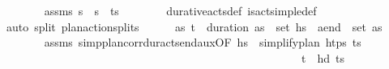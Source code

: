 \begin{isabellebody}
\ \ \ \ \ \ \isamarkupfalse%
\ assms\ {\isacartoucheopen}{\isasympi}s\ {\isacharequal}{\kern0pt}\ {\isasympi}s\ {\isacharat}{\kern0pt}\ {\isacharparenleft}{\kern0pt}{\isacharparenleft}{\kern0pt}t\isactrlsub {\isasympi}{\isacharcomma}{\kern0pt}{\isasympi}{\isacharparenright}{\kern0pt}{\isacharhash}{\kern0pt}{\isasympi}s\isanewline
\ \ \ \ \ \ \isamarkupfalse%
\ durative{\isacharunderscore}{\kern0pt}acts{\isacharunderscore}{\kern0pt}def\ is{\isacharunderscore}{\kern0pt}act{\isacharunderscore}{\kern0pt}simple{\isacharunderscore}{\kern0pt}def\ \isamarkupfalse%
\ {\isacharparenleft}{\kern0pt}auto\ split{\isacharcolon}{\kern0pt}\ plan{\isacharunderscore}{\kern0pt}action{\isachardot}{\kern0pt}splits{\isacharparenright}{\kern0pt}\isanewline
\ \ \ \ \isamarkupfalse%
\ {\isachardoublequoteopen}{\isasymexists}as{\isachardot}{\kern0pt}\ {\isacharparenleft}{\kern0pt}t\isactrlsub {\isasympi}\ {\isacharplus}{\kern0pt}\ {\isacharparenleft}{\kern0pt}duration\ {\isasympi}{\isacharparenright}{\kern0pt}{\isacharcomma}{\kern0pt}as{\isacharparenright}{\kern0pt}\ {\isasymin}\ set\ hs{\isacharprime}{\kern0pt}\ {\isasymand}\ a\isactrlsub e\isactrlsub n\isactrlsub d\ {\isasymin}\ set\ as{\isachardoublequoteclose}\isanewline
\ \ \ \ \ \ \isamarkupfalse%
\ assms\ simp{\isacharunderscore}{\kern0pt}plan{\isacharunderscore}{\kern0pt}corr{\isacharunderscore}{\kern0pt}dur{\isacharunderscore}{\kern0pt}acts{\isacharunderscore}{\kern0pt}end{\isacharunderscore}{\kern0pt}aux{\isacharbrackleft}{\kern0pt}OF\ {\isacartoucheopen}hs{\isacharprime}{\kern0pt}\ {\isacharequal}{\kern0pt}\ simplify{\isacharunderscore}{\kern0pt}plan\ htps\ {\isacharparenleft}{\kern0pt}{\isacharparenleft}{\kern0pt}t\isactrlsub {\isasympi}{\isacharcomma}{\kern0pt}{\isasympi}{\isacharparenright}{\kern0pt}{\isacharhash}{\kern0pt}{\isasympi}s\ \isanewline
\ \ \ \ \ \ \ \ \ \ \ \ \ \ \ \ \ \ \ \ \ \ \ \ \ \ \ \ \ \ \ \ \ \ \ \ \ \ \ \ \ \ \ \ \ \ \ \ \ \ \ \ \ {\isacartoucheopen}{\isacharparenleft}{\kern0pt}t\isactrlsub {\isasympi}{\isacharcomma}{\kern0pt}{\isasympi}{\isacharparenright}{\kern0pt}\ {\isacharequal}{\kern0pt}\ hd\ {\isacharparenleft}{\kern0pt}{\isacharparenleft}{\kern0pt}t\isactrlsub {\isasympi}{\isacharcomma}{\kern0pt}{\isasympi}{\isacharparenright}{\kern0pt}{\isacharhash}{\kern0pt}{\isasympi}s\ \isanewline

\end{isabellebody}
